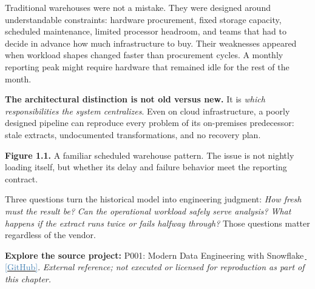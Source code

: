 \documentclass[11pt,twoside]{article}
\newcommand{\repo}[2]{\par\begingroup\small\sffamily\color{inkgray}\textbf{Explore the source project:} #1\,\href{#2}{\,\textcolor{steelblue}{[GitHub]}}. \textit{External reference; not executed or licensed for reproduction as part of this chapter.}\par\endgroup}
\begin{document}
Traditional warehouses were not a mistake. They were designed around understandable constraints: hardware procurement, fixed storage capacity, scheduled maintenance, limited processor headroom, and teams that had to decide in advance how much infrastructure to buy. Their weaknesses appeared when workload shapes changed faster than procurement cycles. A monthly reporting peak might require hardware that remained idle for the rest of the month.

\begin{whitebox}
\textbf{The architectural distinction is not old versus new.} It is \emph{which responsibilities the system centralizes}. Even on cloud infrastructure, a poorly designed pipeline can reproduce every problem of its on-premises predecessor: stale extracts, undocumented transformations, and no recovery plan.
\end{whitebox}

\begin{center}
\end{center}
{\small\color{inkgray}\textbf{Figure 1.1.} A familiar scheduled warehouse pattern. The issue is not nightly loading itself, but whether its delay and failure behavior meet the reporting contract.}\par

Three questions turn the historical model into engineering judgment: \emph{How fresh must the result be?} \emph{Can the operational workload safely serve analysis?} \emph{What happens if the extract runs twice or fails halfway through?} Those questions matter regardless of the vendor.
\repo{P001: Modern Data Engineering with Snowflake}{https://github.com/Snowflake-Labs/modern-data-engineering-snowflake}
\end{document}
